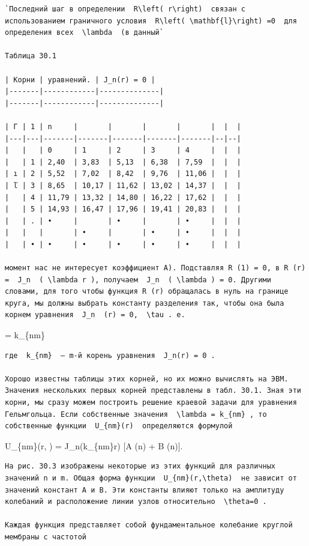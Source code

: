\documentclass[
  ukrainian,
]{article}
\begin{document}
\begin{verbatim}
`Последний шаг в определении  R\left( r\right)  связан с использованием граничного условия  R\left( \mathbf{l}\right) =0  для определения всех  \lambda  (в данный`

Таблица 30.1

| Корни | уравнений. | J_n(r) = 0 |
|-------|------------|--------------|
|-------|------------|--------------|

| Γ | 1 | n     |       |       |       |       |  |  |
|---|---|-------|-------|-------|-------|-------|--|--|
|   |   | 0     | 1     | 2     | 3     | 4     |  |  |
|   | 1 | 2,40  | 3,83  | 5,13  | 6,38  | 7,59  |  |  |
| ı | 2 | 5,52  | 7,02  | 8,42  | 9,76  | 11,06 |  |  |
| ľ | 3 | 8,65  | 10,17 | 11,62 | 13,02 | 14,37 |  |  |
|   | 4 | 11,79 | 13,32 | 14,80 | 16,22 | 17,62 |  |  |
|   | 5 | 14,93 | 16,47 | 17,96 | 19,41 | 20,83 |  |  |
|   | . | •     |       | •     |       | •     |  |  |
|   |   |       | •     |       | •     | •     |  |  |
|   | • | •     | •     | •     | •     | •     |  |  |

момент нас не интересует коэффициент A). Подставляя R (1) = 0, в R (r) =  J_n  ( \lambda r ), получаем  J_n  ( \lambda ) = 0. Другими словами, для того чтобы функция R (r) обращалась в нуль на границе круга, мы должны выбрать константу разделения так, чтобы она была корнем уравнения  J_n  (r) = 0,  \tau . e.
\end{verbatim}

\lambda = k\_\{nm\}

\begin{verbatim}
где  k_{nm}  — m-й корень уравнения  J_n(r) = 0 .

Хорошо известны таблицы этих корней, но их можно вычислять на ЭВМ. Значения нескольких первых корней представлены в табл. 30.1. Зная эти корни, мы сразу можем построить решение краевой задачи для уравнения Гельмгольца. Если собственные значения  \lambda = k_{nm} , то собственные функции  U_{nm}(r)  определяются формулой
\end{verbatim}

U\_\{nm\}(r, \theta) = J\_n(k\_\{nm\}r) {[}A \sin(n\theta) + B
\cos(n\theta){]}.

\begin{verbatim}
На рис. 30.3 изображены некоторые из этих функций для различных значений n и m. Общая форма функции  U_{nm}(r,\theta)  не зависит от значений констант A и B. Эти константы влияют только на амплитуду колебаний и расположение линии узлов относительно  \theta=0 .

Каждая функция представляет собой фундаментальное колебание круглой мембраны с частотой
\end{verbatim}
\end{document}
